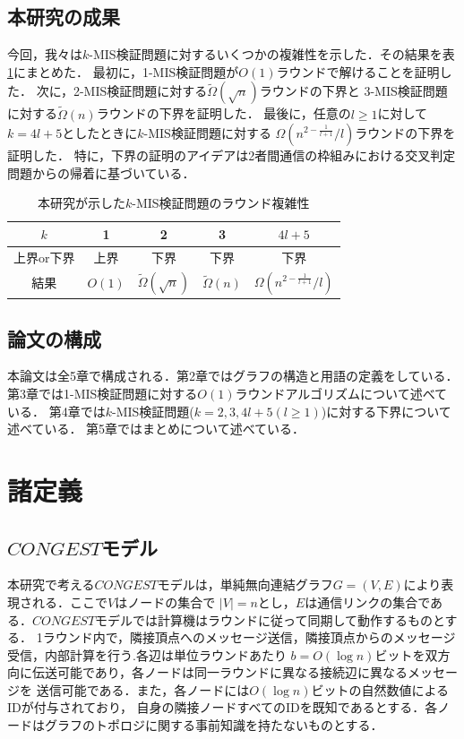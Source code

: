 \documentclass[12pt]{thesis}
\theoremstyle{definition}
\begin{document}
\section{本研究の成果}
今回，我々は$k$-MIS検証問題に対するいくつかの複雑性を示した．その結果を表\ref{tab: k-MIS}にまとめた．
最初に，1-MIS検証問題が$O(1)$ラウンドで解けることを証明した．
次に，2-MIS検証問題に対する$\tilde{\Omega} (\sqrt{n})$ラウンドの下界と
3-MIS検証問題に対する$\tilde{\Omega} (n)$ラウンドの下界を証明した．
最後に，任意の$l \geq 1$に対して$k = 4l + 5$としたときに$k$-MIS検証問題に対する
$\Omega\left(n^{2 - \frac{1}{l+1}}/l\right)$ラウンドの下界を証明した．
特に，下界の証明のアイデアは2者間通信の枠組みにおける交叉判定問題からの帰着に基づいている．

\begin{table}[htb]
  \begin{center}
    \caption{本研究が示した$k$-MIS検証問題のラウンド複雑性}
    \begin{tabular}{|c||c|c|c|c|} \hline
      $k$ & 1 & 2 & 3 & $4l + 5$ \\ \hline
      上界or下界 & 上界 & 下界 & 下界 & 下界 \\ \hline
      結果 & $O(1)$ & $\tilde{\Omega} (\sqrt{n})$ & $\tilde{\Omega} (n)$ & $\Omega\left(n^{2 - \frac{1}{l+1}}/l\right)$ \\ \hline
    \end{tabular}
    \label{tab: k-MIS}
  \end{center}
\end{table}


\section{論文の構成}
本論文は全5章で構成される．第2章ではグラフの構造と用語の定義をしている．
第3章では1-MIS検証問題に対する$O(1)$ラウンドアルゴリズムについて述べている．
第4章では$k$-MIS検証問題($k = 2, 3, 4l + 5 ( l \geq 1)$)に対する下界について述べている．
第5章ではまとめについて述べている．

\chapter{諸定義}

\section{$CONGEST$モデル}
本研究で考える$CONGEST$モデルは，単純無向連結グラフ$G = (V, E)$により表現される．ここで$V$はノードの集合で
$|V| = n$とし，$E$は通信リンクの集合である．$CONGEST$モデルでは計算機はラウンドに従って同期して動作するものとする．
1ラウンド内で，隣接頂点へのメッセージ送信，隣接頂点からのメッセージ受信，内部計算を行う.各辺は単位ラウンドあたり
$b = O(\log n)$ビットを双方向に伝送可能であり，各ノードは同一ラウンドに異なる接続辺に異なるメッセージを
送信可能である．また，各ノードには$O(\log n)$ビットの自然数値によるIDが付与されており，
自身の隣接ノードすべてのIDを既知であるとする．各ノードはグラフのトポロジに関する事前知識を持たないものとする．
\end{document}
